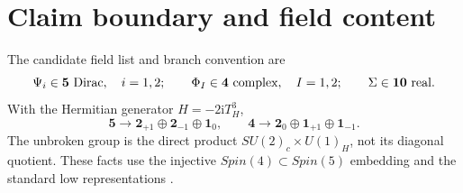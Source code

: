 \documentclass[11pt]{article}
\theoremstyle{definition}
\theoremstyle{remark}
\newcommand{\ii}{\mathrm i}
\begin{document}
\begin{abstract}
This does not determine the full target phases.  The microscopic action has
no map from \((g,s)\in S^3\times S^2\) to a full all-branch chiral
Dirac--Yukawa/PV family: \(g\) is composite and no \(s\)-dependent fermion
mass is declared.  Consequently there is no pullback determinant line over
\(\operatorname{Map}(M_4,S^3\times S^2)\).  We prove non-identifiability by
stacking the two independent zero-curvature spin characters
\((-1)^{\nu_3}\) and \((-1)^{\nu_2}\), which leaves every local symbol and
the pure threshold unchanged while flipping either target sign.  Moreover,
two controlled ansaetze have been evaluated: a uniform exact flavour mass map
on the complete \(\bm5\) has mixed coefficient \(+2-2=0\), whereas a
light-only emergent flavour assignment has no declared deep-UV target family.
These cases do not exhaust continuous equivariant non-projector couplings.
Hence the present work does not give an all-scale \(k=+2\) matching theorem.
No portal is authorized.
\end{abstract}

\tableofcontents

\section{Claim boundary and field content}

The candidate field list and branch convention are
\begin{equation}
 \Psi_i\in\bm5\ \hbox{Dirac},\quad i=1,2;\qquad
 \Phi_I\in\bm4\ \hbox{complex},\quad I=1,2;\qquad
 \Sigma\in\bm{10}\ \hbox{real}.
 \label{eq:field-list}
\end{equation}
With the Hermitian generator \(H=-2\ii T_H^3\),
\begin{equation}
 \bm5\longrightarrow\bm2_{+1}\oplus\bm2_{-1}\oplus\bm1_0,
 \qquad
 \bm4\longrightarrow\bm2_0\oplus\bm1_{+1}\oplus\bm1_{-1}.
 \label{eq:branching}
\end{equation}
The unbroken group is the direct product
\(SU(2)_c\times U(1)_H\), not its diagonal quotient.  These facts use the
injective \(Spin(4)\subset Spin(5)\) embedding and the standard low
representations \cite{Slansky1981}.
\end{document}
